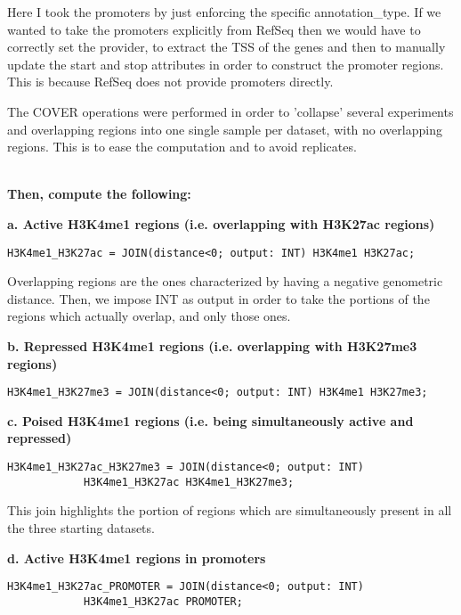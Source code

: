 \documentclass[12pt, a4paper]{article}
\begin{document}
Here I took the promoters by just enforcing the specific annotation\_type. If we wanted to take the promoters explicitly from RefSeq then we would have to correctly set the provider, to extract the TSS of the genes and then to manually update the start and stop attributes in order to construct the promoter regions. This is because RefSeq does not provide promoters directly.

The COVER operations were performed in order to 'collapse' several experiments and overlapping regions into one single sample per dataset, with no overlapping regions. This is to ease the computation and to avoid replicates.

\textbf{\\Then, compute the following:}

\textbf{a. Active H3K4me1 regions (i.e. overlapping with H3K27ac regions)}

\begin{verbatim}
H3K4me1_H3K27ac = JOIN(distance<0; output: INT) H3K4me1 H3K27ac;
\end{verbatim}

Overlapping regions are the ones characterized by having a negative genometric distance. Then, we impose INT as output in order to take the portions of the regions which actually overlap, and only those ones.

\textbf{b. Repressed H3K4me1 regions (i.e. overlapping with H3K27me3 regions)}

\begin{verbatim}
H3K4me1_H3K27me3 = JOIN(distance<0; output: INT) H3K4me1 H3K27me3;
\end{verbatim} 

\textbf{c. Poised H3K4me1 regions (i.e. being simultaneously active and repressed)}

\begin{verbatim}
H3K4me1_H3K27ac_H3K27me3 = JOIN(distance<0; output: INT)
            H3K4me1_H3K27ac H3K4me1_H3K27me3;
\end{verbatim} 

This join highlights the portion of regions which are simultaneously present in all the three starting datasets.

\textbf{d. Active H3K4me1 regions in promoters}

\begin{verbatim}
H3K4me1_H3K27ac_PROMOTER = JOIN(distance<0; output: INT)
            H3K4me1_H3K27ac PROMOTER;
\end{verbatim} 
\end{document}
